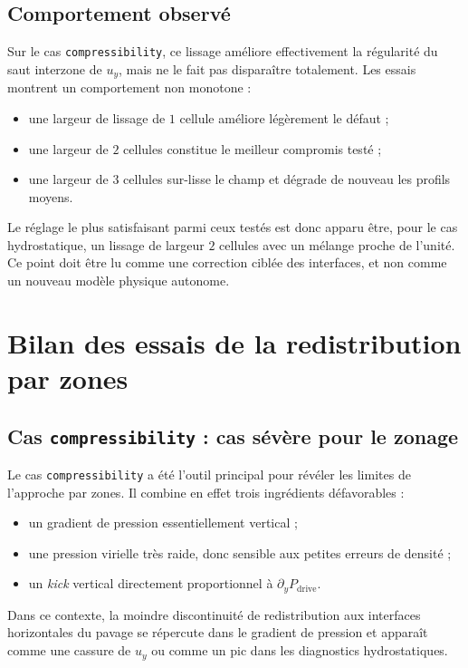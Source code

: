\documentclass[11pt,a4paper]{article}
\begin{document}
\subsection{Comportement observé}

Sur le cas \texttt{compressibility}, ce lissage améliore effectivement la régularité du saut interzone de $u_y$, mais ne le fait pas disparaître totalement. Les essais montrent un comportement non monotone :
\begin{itemize}
  \item une largeur de lissage de $1$ cellule améliore légèrement le défaut ;
  \item une largeur de $2$ cellules constitue le meilleur compromis testé ;
  \item une largeur de $3$ cellules sur-lisse le champ et dégrade de nouveau les profils moyens.
\end{itemize}
Le réglage le plus satisfaisant parmi ceux testés est donc apparu être, pour le cas hydrostatique, un lissage de largeur $2$ cellules avec un mélange proche de l'unité. Ce point doit être lu comme une correction ciblée des interfaces, et non comme un nouveau modèle physique autonome.

\section{Bilan des essais de la redistribution par zones}

\subsection{Cas \texttt{compressibility} : cas sévère pour le zonage}

Le cas \texttt{compressibility} a été l'outil principal pour révéler les limites de l'approche par zones. Il combine en effet trois ingrédients défavorables :
\begin{itemize}
  \item un gradient de pression essentiellement vertical ;
  \item une pression virielle très raide, donc sensible aux petites erreurs de densité ;
  \item un \emph{kick} vertical directement proportionnel à $\partial_y P_{\mathrm{drive}}$.
\end{itemize}
Dans ce contexte, la moindre discontinuité de redistribution aux interfaces horizontales du pavage se répercute dans le gradient de pression et apparaît comme une cassure de $u_y$ ou comme un pic dans les diagnostics hydrostatiques.
\end{document}
